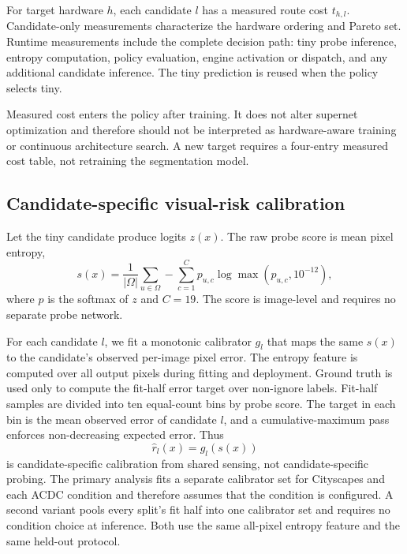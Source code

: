 \documentclass[a4paper,review,12pt]{elsarticle}
\begin{document}
For target hardware $h$, each candidate $l$ has a measured route cost $t_{h,l}$. Candidate-only measurements characterize the hardware ordering and Pareto set. Runtime measurements include the complete decision path: tiny probe inference, entropy computation, policy evaluation, engine activation or dispatch, and any additional candidate inference. The tiny prediction is reused when the policy selects tiny.

Measured cost enters the policy after training. It does not alter supernet optimization and therefore should not be interpreted as hardware-aware training or continuous architecture search. A new target requires a four-entry measured cost table, not retraining the segmentation model.

\subsection{Candidate-specific visual-risk calibration}
\label{sec:calibration}

Let the tiny candidate produce logits $z(x)$. The raw probe score is mean pixel entropy,
\begin{equation}
s(x)=\frac{1}{|\Omega|}\sum_{u\in\Omega}-\sum_{c=1}^{C}p_{u,c}\log\max(p_{u,c},10^{-12}),
\label{eq:entropy}
\end{equation}
where $p$ is the softmax of $z$ and $C=19$. The score is image-level and requires no separate probe network.

For each candidate $l$, we fit a monotonic calibrator $g_l$ that maps the same $s(x)$ to the candidate's observed per-image pixel error. The entropy feature is computed over all output pixels during fitting and deployment. Ground truth is used only to compute the fit-half error target over non-ignore labels. Fit-half samples are divided into ten equal-count bins by probe score. The target in each bin is the mean observed error of candidate $l$, and a cumulative-maximum pass enforces non-decreasing expected error. Thus
\begin{equation}
\widehat{r}_l(x)=g_l(s(x))
\label{eq:risk}
\end{equation}
is candidate-specific calibration from shared sensing, not candidate-specific probing. The primary analysis fits a separate calibrator set for Cityscapes and each ACDC condition and therefore assumes that the condition is configured. A second variant pools every split's fit half into one calibrator set and requires no condition choice at inference. Both use the same all-pixel entropy feature and the same held-out protocol.
\end{document}
